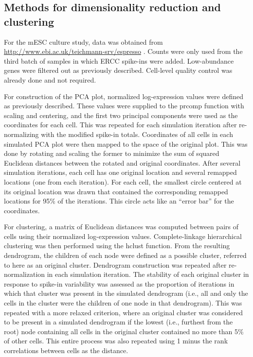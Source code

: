 \documentclass{article}
\begin{document}
\subsection{Methods for dimensionality reduction and clustering}
For the mESC culture study, data was obtained from \url{http://www.ebi.ac.uk/teichmann-srv/espresso} \cite{kolod2015single}.
Counts were only used from the third batch of samples in which ERCC spike-ins were added.
Low-abundance genes were filtered out as previously described.
Cell-level quality control was already done and not required.

For construction of the PCA plot, normalized log-expression values were defined as previously described.
These values were supplied to the prcomp function with scaling and centering, and the first two principal components were used as the coordinates for each cell.
This was repeated for each simulation iteration after re-normalizing with the modified spike-in totals.
Coordinates of all cells in each simulated PCA plot were then mapped to the space of the original plot.
This was done by rotating and scaling the former to minimize the sum of squared Euclidean distances between the rotated and original coordinates.
After several simulation iterations, each cell has one original location and several remapped locations (one from each iteration). 
For each cell, the smallest circle centered at its original location was drawn that contained the corresponding remapped locations for 95\% of the iterations.
This circle acts like an ``error bar'' for the coordinates.

For clustering, a matrix of Euclidean distances was computed between pairs of cells using their normalized log-expression values.
Complete-linkage hierarchical clustering was then performed using the hclust function.
From the resulting dendrogram, the children of each node were defined as a possible cluster, referred to here as an original cluster.
Dendrogram construction was repeated after re-normalization in each simulation iteration.
The stability of each original cluster in response to spike-in variability was assessed as the proportion of iterations in which that cluster was present in the simulated dendrogram (i.e., all and only the cells in the cluster were the children of one node in that dendrogram).
This was repeated with a more relaxed criterion, where an original cluster was considered to be present in a simulated dendrogram if the lowest (i.e., furthest from the root) node containing all cells in the original cluster contained no more than 5\% of other cells.
This entire process was also repeated using 1 minus the rank correlations between cells as the distance.
\end{document}
